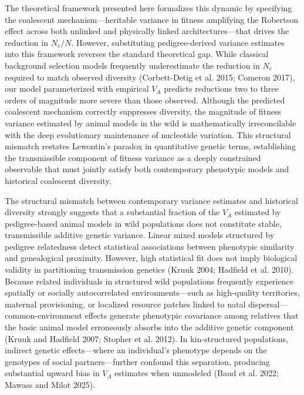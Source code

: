 \documentclass[12pt]{article}
\begin{document}
The theoretical framework presented here formalizes this dynamic by specifying the coalescent mechanism—heritable variance in fitness amplifying the Robertson effect across both unlinked and physically linked architectures—that drives the reduction in $N_e/N$. However, substituting pedigree-derived variance estimates into this framework reverses the standard theoretical gap. While classical background selection models frequently underestimate the reduction in $N_e$ required to match observed diversity (Corbett-Detig et al. 2015; Comeron 2017), our model parameterized with empirical $V_A$ predicts reductions two to three orders of magnitude more severe than those observed. Although the predicted coalescent mechanism correctly suppresses diversity, the magnitude of fitness variance estimated by animal models in the wild is mathematically irreconcilable with the deep evolutionary maintenance of nucleotide variation. This structural mismatch restates Lewontin’s paradox in quantitative genetic terms, establishing the transmissible component of fitness variance as a deeply constrained observable that must jointly satisfy both contemporary phenotypic models and historical coalescent diversity.

The structural mismatch between contemporary variance estimates and historical diversity strongly suggests that a substantial fraction of the $V_A$ estimated by pedigree-based animal models in wild populations does not constitute stable, transmissible additive genetic variance. Linear mixed models structured by pedigree relatedness detect statistical associations between phenotypic similarity and genealogical proximity. However, high statistical fit does not imply biological validity in partitioning transmission genetics (Kruuk 2004; Hadfield et al. 2010). Because related individuals in structured wild populations frequently experience spatially or socially autocorrelated environments—such as high-quality territories, maternal provisioning, or localized resource patches linked to natal dispersal—common-environment effects generate phenotypic covariance among relatives that the basic animal model erroneously absorbs into the additive genetic component (Kruuk and Hadfield 2007; Stopher et al. 2012). In kin-structured populations, indirect genetic effects—where an individual's phenotype depends on the genotypes of social partners—further confound this separation, producing substantial upward bias in $V_A$ estimates when unmodeled (Baud et al. 2022; Mawass and Milot 2025).
\end{document}
